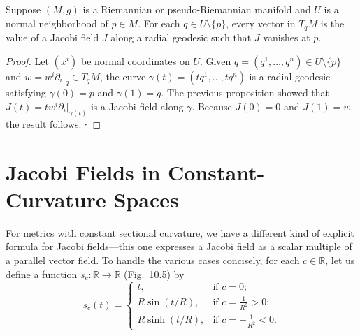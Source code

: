 \begin{corollary}\label{cor:jacobi-field-tangent-vectors}
Suppose $(M, g)$ is a Riemannian or pseudo-Riemannian manifold and $U$ is a normal neighborhood of $p \in M$. For each $q \in U \setminus \{p\}$, every vector in $T_q M$ is the value of a Jacobi field $J$ along a radial geodesic such that $J$ vanishes at $p$.
\end{corollary}

\begin{proof}
Let $(x^i)$ be normal coordinates on $U$. Given $q = (q^1, \ldots, q^n) \in U \setminus \{p\}$ and $w = w^i \partial_i|_q \in T_q M$, the curve $\gamma(t) = (tq^1, \ldots, tq^n)$ is a radial geodesic satisfying $\gamma(0) = p$ and $\gamma(1) = q$. The previous proposition showed that $J(t) = tw^i \partial_i|_{\gamma(t)}$ is a Jacobi field along $\gamma$. Because $J(0) = 0$ and $J(1) = w$, the result follows. $\square$
\end{proof}

\section{Jacobi Fields in Constant-Curvature Spaces}

For metrics with constant sectional curvature, we have a different kind of explicit formula for Jacobi fields---this one expresses a Jacobi field as a scalar multiple of a parallel vector field. To handle the various cases concisely, for each $c \in \mathbb{R}$, let us define a function $s_c : \mathbb{R} \to \mathbb{R}$ (Fig.\ 10.5) by
\begin{equation}
s_c(t) = \begin{cases}
t, & \text{if } c = 0; \\
R \sin(t/R), & \text{if } c = \frac{1}{R^2} > 0; \\
R \sinh(t/R), & \text{if } c = -\frac{1}{R^2} < 0.
\end{cases}
\tag{10.8}
\end{equation}


